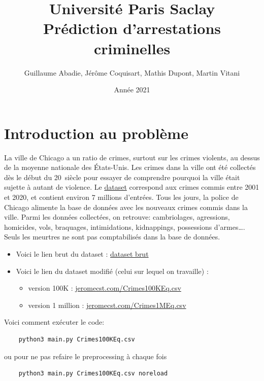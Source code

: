 \documentclass{article}
\title{\textbf{\Huge  Université Paris Saclay}\\ Prédiction d'arrestations criminelles}
\author{Guillaume Abadie, Jérôme Coquisart, Mathis Dupont, Martin Vitani}
\date{Année 2021}
\begin{document}
    \maketitle
    \tableofcontents

    \section{Introduction au problème}
    La ville de Chicago a un ratio de crimes, surtout sur les crimes violents,
    au dessus de la moyenne nationale des États-Unis.
    Les crimes dans la ville ont été collectés dès le début du 20\ieme~siècle pour
    essayer de comprendre pourquoi la ville était sujette à autant de violence.
    Le \href{https://www.kaggle.com/n3v375/chicago-crime-from-01jan2001-to-22jul2020}{dataset} correspond aux crimes commis entre 2001 et 2020, et contient environ 
    7 millions d'entrées.
    Tous les jours, la police de Chicago alimente la base de données avec les
    nouveaux crimes commis dans la ville. 
    Parmi les données collectées, on retrouve: 
    cambriolages, agressions, homicides, vols, braquages, intimidations, kidnappings, 
    possessions d'armes\dots.
    Seuls les meurtres ne sont pas comptabilisés dans la base de données.

    \begin{itemize}
	    \item Voici le lien brut du dataset :
		    \href{https://www.kaggle.com/n3v375/chicago-crime-from-01jan2001-to-22jul2020}{dataset brut}
	    \item Voici le lien du dataset modifié (celui sur lequel on travaille) :
		    \begin{itemize}
			    \item version 100K :
				    \href{https://jeromecst.com/Crimes100KEq.csv}{jeromecst.com/Crimes100KEq.csv}
			    \item version 1 million :
				    \href{https://jeromecst.com/Crimes1MEq.csv}{jeromecst.com/Crimes1MEq.csv}
		    \end{itemize}
    \end{itemize}

    Voici comment exécuter le code:
    \begin{Verbatim}
    python3 main.py Crimes100KEq.csv
    \end{Verbatim}
    ou pour ne pas refaire le preprocessing à chaque fois
    \begin{Verbatim}
    python3 main.py Crimes100KEq.csv noreload
    \end{Verbatim}
\end{document}
